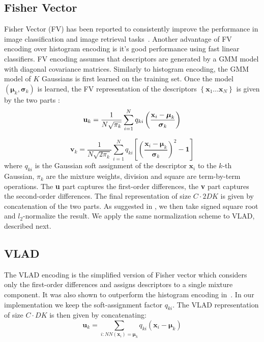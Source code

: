 \documentclass[10pt,twocolumn,letterpaper]{article}
\begin{document}
\subsection{Fisher Vector}
\label{subsec:fvenc}
Fisher Vector (FV) has been reported to consistently improve the performance in image classification and image retrieval tasks~\cite{Jegou12}.
Another advantage of FV encoding over histogram encoding is it's good performance using fast linear classifiers.
FV encoding assumes that descriptors are generated by a GMM model with diagonal covariance matrices. Similarly to histogram encoding, the GMM model of $K$ Gaussians is first learned on the training set. 
Once the model $\left(\boldsymbol\mu_k, \boldsymbol\sigma_k\right)$ is learned, the FV representation of the descriptors $\left\{\textbf{x}_1\dots \textbf{x}_N\right\}$ is given by the two parts \cite{Perronnin10}:
$${\textbf u}_k = \frac{1}{N\sqrt{\pi_k}}\sum_{i=1}^{N}q_{ki}\left(\frac{\textbf{x}_i-\boldsymbol\mu_k}{\boldsymbol\sigma_k}\right)$$

\begin{equation}
\label{eq:fv_vk}
\textbf{v}_k=\frac{1}{N\sqrt{2\pi_k}}\sum_{i=1}^{N}q_{ki}\left[\left(\frac{\textbf{x}_i-\boldsymbol\mu_k}{\boldsymbol\sigma_k}\right)^2-\textbf{1}\right]
\end{equation}
where $q_{ki}$ is the Gaussian soft assignment of the descriptor $\textbf{x}_i$ to the $k$-th Gaussian, $\pi_k$ are the mixture weights, division and square are term-by-term operations. The \textbf{u} part captures the first-order differences, the \textbf{v} part captures the second-order differences. The final representation of size $C\cdot 2DK$ is given by concatenation of the two parts. As suggested in \cite{Perronnin10}, we then take signed square root and $l_2$-normalize the result. We apply the same normalization scheme to VLAD, described next.
\subsection{VLAD}
\label{subsec:vladenc}
The VLAD encoding is the simplified version of Fisher vector which considers only the first-order differences and assigns descriptors to a single mixture component. It was also shown to outperform the histogram encoding in~\cite{Jegou12}. In our implementation we keep the soft-assignment factor $q_{ki}$. The VLAD representation of size $C\cdot DK$ is then given by concatenating:$$\textbf{u}_k=\sum_{i : NN\left(\textbf{x}_i\right)=\boldsymbol\mu_k}q_{ki}\left(\textbf{x}_i -\boldsymbol\mu_k\right)$$
\end{document}
